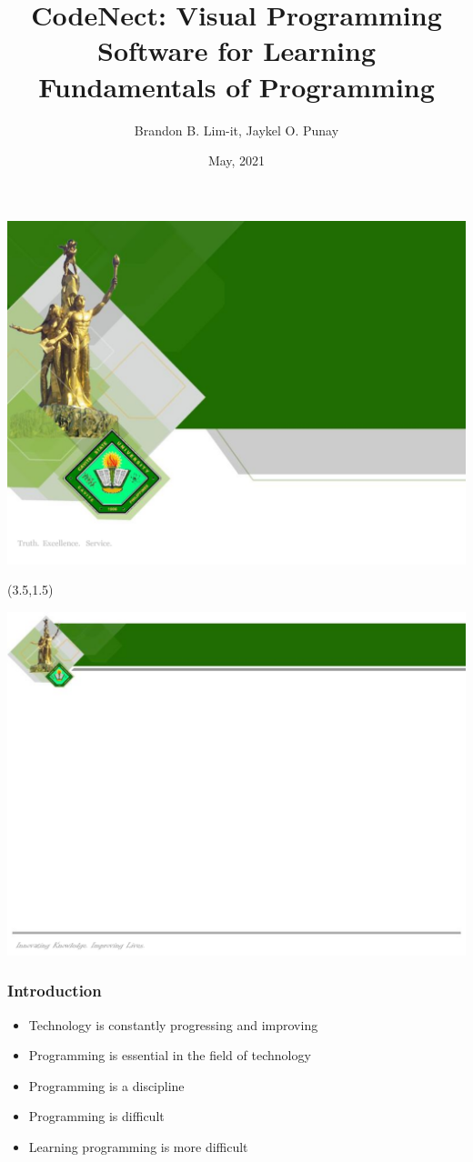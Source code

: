 \documentclass[handout]{beamer}
\title{CodeNect: Visual Programming Software for Learning Fundamentals of Programming}
\author{Brandon B. Lim-it, Jaykel O. Punay}
\date{May, 2021}
\begin{document}
{\includegraphics[width=\paperwidth,height=\paperheight,keepaspectratio]{template_title.png}}

\begin{frame}
	\begin{textblock}{6}(3.5,1.5)
		\titlepage
	\end{textblock}
\end{frame}

{\includegraphics[width=\paperwidth,height=\paperheight,keepaspectratio]{template.png}}

\begin{frame}
	\frametitle{Introduction}
	\begin{itemize}
			\item<1-> Technology is constantly progressing and improving
			\item<2-> Programming is essential in the field of technology
			\item<3-> Programming is a discipline
			\item<4-> Programming is difficult
			\item<5-> Learning programming is more difficult
	\end{itemize}
\end{frame}
\end{document}
